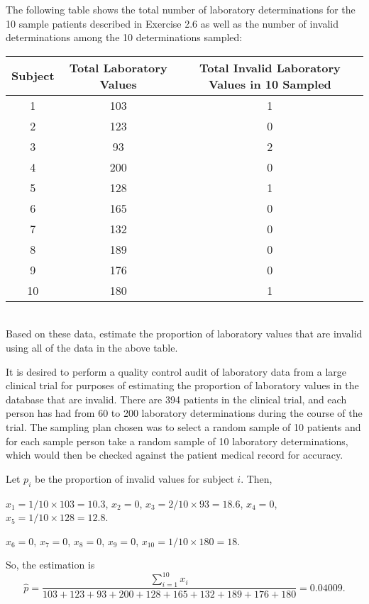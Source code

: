 \documentclass[12pt]{article}
\begin{document}
    \begin{exercise}[Levy-2.8]
        The following table shows the total number of laboratory determinations for the 10 sample patients described in Exercise 2.6 as well as the number of invalid determinations among the 10 determinations sampled: \\[0.5em]
        \begin{tabular}{ccc}
            \hline Subject & Total Laboratory Values & Total Invalid Laboratory Values in 10 Sampled \\
            \hline 1 & 103 & 1 \\
            2 & 123 & 0 \\
            3 & 93 & 2 \\
            4 & 200 & 0 \\
            5 & 128 & 1 \\
            6 & 165 & 0 \\
            7 & 132 & 0 \\
            8 & 189 & 0 \\
            9 & 176 & 0 \\
            10 & 180 & 1 \\
            \hline
        \end{tabular}
        \\[0.5em]
        Based on these data, estimate the proportion of laboratory values that are invalid using all of the data in the above table. 
    \end{exercise}
    \begin{exercise}[Exercise 2.6]
        It is desired to perform a quality control audit of laboratory data from a large clinical trial for purposes of estimating the proportion of laboratory values in the database that are invalid. There are 394 patients in the clinical trial, and each person has had from 60 to 200 laboratory determinations during the course of the trial. The sampling plan chosen was to select a random sample of 10 patients and for each sample person take a random sample of 10 laboratory determinations, which would then be checked against the patient medical record for accuracy. 
    \end{exercise}

    \begin{solution}
        Let $p_{i}$ be the proportion of invalid values for subject $i$. Then, 

        $x_1=1/10\times103=10.3$, $x_2=0$, $x_3=2/10\times93=18.6$, $x_4=0$, $x_5=1/10\times128=12.8$. 

        $x_6=0$, $x_7=0$, $x_8=0$, $x_9=0$, $x_{10}=1/10\times180=18$. 

        So, the estimation is 
        \[
            \hat{p}=\frac{\sum_{i=1}^{10} x_i}{103+123+93+200+128+165+132+189+176+180}=0.04009. 
        \]
    \end{solution}
\end{document}
